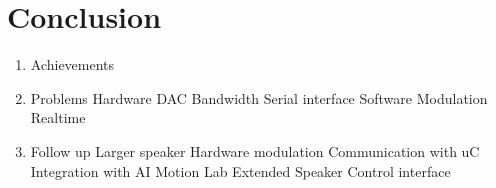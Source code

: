 \chapter{Conclusion}

\begin{enumerate}
  \item Achievements
  \item Problems
  \subitem Hardware
  \subsubitem DAC
  \subsubitem Bandwidth
  \subsubitem Serial interface
  \subitem Software
  \subsubitem Modulation
  \subsubitem Realtime
  \item Follow up
  \subitem Larger speaker
  \subitem Hardware modulation
  \subitem Communication with uC
  \subitem Integration with AI Motion Lab
  \subitem Extended Speaker Control interface
\end{enumerate}